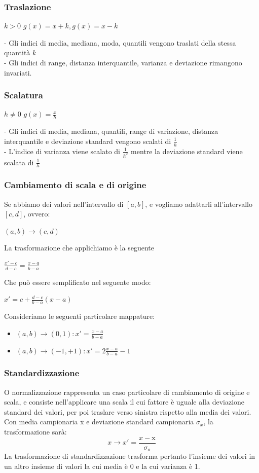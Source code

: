 \subsubsection{Traslazione}
\begin{center}
$k > 0$ $g(x) = x + k, g(x) = x-k$
\end{center}
- Gli indici di media, mediana, moda, quantili vengono traslati della stessa quantità $k$\\
- Gli indici di range, distanza interquantile, varianza e deviazione rimangono invariati.
\subsubsection{Scalatura}
\begin{center}
$h \neq 0$ $g(x) = \frac{x}{h}$
\end{center}
- Gli indici di media, mediana, quantili, range di variazione, distanza interquantile e deviazione standard vengono scalati di $\frac{1}{h}$\\
- L'indice di varianza viene scalato di $\frac{1}{h^2}$ mentre la deviazione standard viene scalata di $\frac{1}{h}$

\subsubsection{Cambiamento di scala e di origine}
Se abbiamo dei valori nell'intervallo di $[a, b]$, e vogliamo adattarli all'intervallo $[c, d]$, ovvero: 
\begin{center}
$(a, b) \rightarrow (c, d)$
\end{center}
La trasformazione che applichiamo è la seguente \begin{center}
$\frac{x'-c}{d-c} = \frac{x-a}{b-a}$
\end{center}
Che può essere semplificato nel seguente modo:
\begin{center}
$x' = c + \frac{d-c}{b-a} (x-a)$
\end{center}
Consideriamo le seguenti particolare mappature:
\begin{itemize}
\item $(a, b) \rightarrow (0,1): x' = \frac{x-a}{b-a}$
\item $(a, b) \rightarrow (-1, +1): x' = 2 \frac{x-a}{b-a} -1$
\end{itemize}

\subsubsection{Standardizzazione}
O normalizzazione rappresenta un caso particolare di cambiamento di origine e scala, e consiste nell'applicare una scala il cui fattore è uguale alla deviazione standard dei valori, per poi traslare verso sinistra rispetto alla media dei valori. Con media campionaria \={x} e deviazione standard campionaria $\sigma_x$, la trasformazione sarà:
\begin{equation*}
	x \rightarrow x' = \frac{x-\text{\={x}}}{\sigma_o}
\end{equation*}  
La trasformazione di standardizzazione trasforma pertanto l'insieme dei valori in un altro insieme di valori la cui media è 0 e la cui varianza è 1.



